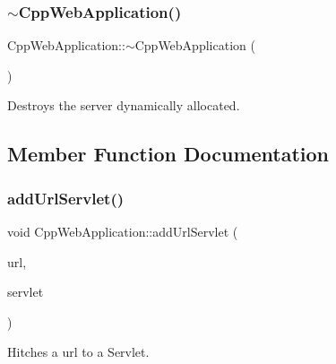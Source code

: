\subsubsection{\texorpdfstring{$\sim$\+Cpp\+Web\+Application()}{~CppWebApplication()}}
{\footnotesize\ttfamily Cpp\+Web\+Application\+::$\sim$\+Cpp\+Web\+Application (\begin{DoxyParamCaption}{ }\end{DoxyParamCaption})}



Destroys the server dynamically allocated. 



\subsection{Member Function Documentation}
\mbox{\label{class_cpp_web_application_aa8c0b5330f0133fc478b921f2a05dcec}} 
\subsubsection{\texorpdfstring{add\+Url\+Servlet()}{addUrlServlet()}}
{\footnotesize\ttfamily void Cpp\+Web\+Application\+::add\+Url\+Servlet (\begin{DoxyParamCaption}\item[{const Q\+String \&}]{url,  }\item[{\hyperlink{class_http_servlet}{Http\+Servlet} $\ast$}]{servlet }\end{DoxyParamCaption})}



Hitches a url to a Servlet. 


